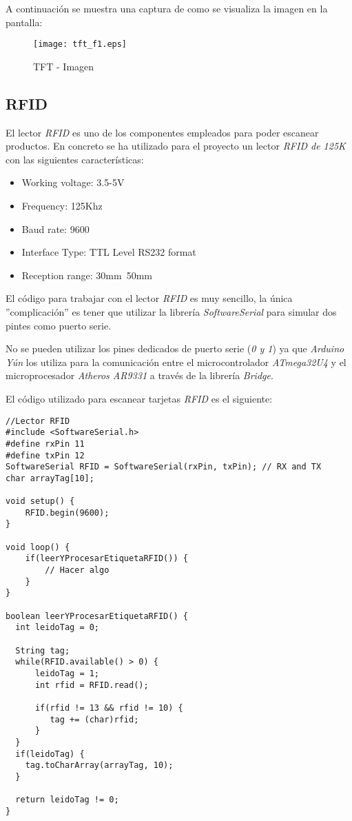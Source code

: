 A continuación se muestra una captura de como se visualiza la imagen en la pantalla:

\begin{figure}[h!]
    \centering
    \texttt{[image: tft\_f1.eps]}
    \caption{TFT - Imagen}\label{fig:tft_f1}
\end{figure}

\subsection{RFID}


El lector \emph{RFID} es uno de los componentes empleados para poder escanear productos. En concreto se ha utilizado para el proyecto un lector \emph{RFID de 125K} con las siguientes características:

\begin{itemize}
    \item Working voltage: 3.5-5V
    \item Frequency: 125Khz
    \item Baud rate: 9600
    \item Interface Type: TTL Level RS232 format
    \item Reception range: 30mm~50mm
\end{itemize}

El código para trabajar con el lector \emph{RFID} es muy sencillo, la única ''complicación'' es tener que utilizar la librería \emph{SoftwareSerial} para simular dos pintes como puerto serie.

No se pueden utilizar los pines dedicados de puerto serie (\emph{0 y 1}) ya que \emph{Arduino Yún} los utiliza para la comunicación entre el microcontrolador \emph{ATmega32U4} y el microprocesador \emph{Atheros AR9331} a través de la librería \emph{Bridge}.

El código utilizado para escanear tarjetas \emph{RFID} es el siguiente:

\begin{lstlisting}
//Lector RFID
#include <SoftwareSerial.h>
#define rxPin 11
#define txPin 12
SoftwareSerial RFID = SoftwareSerial(rxPin, txPin); // RX and TX
char arrayTag[10];

void setup() {
    RFID.begin(9600);
}

void loop() {
    if(leerYProcesarEtiquetaRFID()) {
        // Hacer algo
    }
}

boolean leerYProcesarEtiquetaRFID() {
  int leidoTag = 0;

  String tag;
  while(RFID.available() > 0) {
      leidoTag = 1;
      int rfid = RFID.read();

      if(rfid != 13 && rfid != 10) {
         tag += (char)rfid;
      }
  }
  if(leidoTag) {
    tag.toCharArray(arrayTag, 10);
  }

  return leidoTag != 0;
}
\end{lstlisting}

